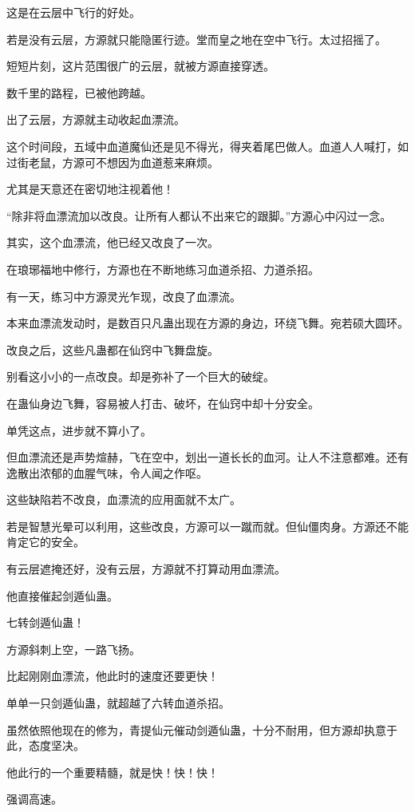 \begin{this_body}
这是在云层中飞行的好处。

若是没有云层，方源就只能隐匿行迹。堂而皇之地在空中飞行。太过招摇了。

短短片刻，这片范围很广的云层，就被方源直接穿透。

数千里的路程，已被他跨越。

出了云层，方源就主动收起血漂流。

这个时间段，五域中血道魔仙还是见不得光，得夹着尾巴做人。血道人人喊打，如过街老鼠，方源可不想因为血道惹来麻烦。

尤其是天意还在密切地注视着他！

“除非将血漂流加以改良。让所有人都认不出来它的跟脚。”方源心中闪过一念。

其实，这个血漂流，他已经又改良了一次。

在琅琊福地中修行，方源也在不断地练习血道杀招、力道杀招。

有一天，练习中方源灵光乍现，改良了血漂流。

本来血漂流发动时，是数百只凡蛊出现在方源的身边，环绕飞舞。宛若硕大圆环。

改良之后，这些凡蛊都在仙窍中飞舞盘旋。

别看这小小的一点改良。却是弥补了一个巨大的破绽。

在蛊仙身边飞舞，容易被人打击、破坏，在仙窍中却十分安全。

单凭这点，进步就不算小了。

但血漂流还是声势煊赫，飞在空中，划出一道长长的血河。让人不注意都难。还有逸散出浓郁的血腥气味，令人闻之作呕。

这些缺陷若不改良，血漂流的应用面就不太广。

若是智慧光晕可以利用，这些改良，方源可以一蹴而就。但仙僵肉身。方源还不能肯定它的安全。

有云层遮掩还好，没有云层，方源就不打算动用血漂流。

他直接催起剑遁仙蛊。

七转剑遁仙蛊！

方源斜刺上空，一路飞扬。

比起刚刚血漂流，他此时的速度还要更快！

单单一只剑遁仙蛊，就超越了六转血道杀招。

虽然依照他现在的修为，青提仙元催动剑遁仙蛊，十分不耐用，但方源却执意于此，态度坚决。

他此行的一个重要精髓，就是快！快！快！

强调高速。


\end{this_body}
